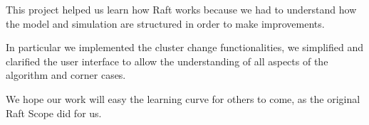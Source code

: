 This project helped us learn how Raft works because we had to understand 
how the model and simulation are structured in order to make improvements.

In particular we implemented the cluster change functionalities,
we simplified and clarified the user interface to allow the understanding of all
aspects of the algorithm and corner cases.

We hope our work will easy the learning curve for others to come,
as the original Raft Scope did for us.
